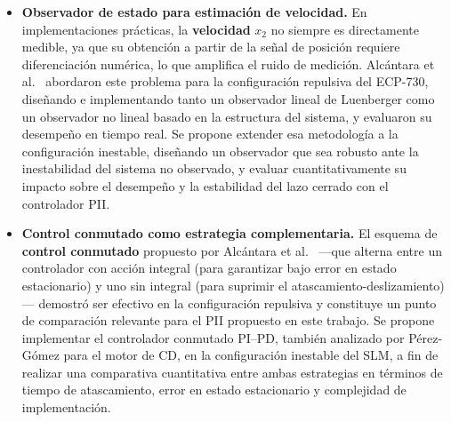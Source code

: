 \begin{itemize}
    \item \textbf{Observador de estado para estimación de velocidad.}
    En implementaciones prácticas, la \textbf{velocidad} $x_2$ no siempre es directamente
    medible, ya que su obtención a partir de la señal de posición requiere diferenciación
    numérica, lo que amplifica el ruido de medición. Alcántara et al.\ \cite{alcantara}
    abordaron este problema para la configuración repulsiva del ECP-730, diseñando e
    implementando tanto un observador lineal de Luenberger como un observador no lineal
    basado en la estructura del sistema, y evaluaron su desempeño en tiempo real.
    Se propone extender esa metodología a la configuración inestable, diseñando un observador
    que sea robusto ante la inestabilidad del sistema no observado, y evaluar cuantitativamente
    su impacto sobre el desempeño y la estabilidad del lazo cerrado con el controlador PII.

    \item \textbf{Control conmutado como estrategia complementaria.}
    El esquema de \textbf{control conmutado} propuesto por Alcántara et al.\ \cite{alcantara}
    ---que alterna entre un controlador con acción integral (para garantizar bajo error en estado
    estacionario) y uno sin integral (para suprimir el atascamiento-deslizamiento)--- demostró
    ser efectivo en la configuración repulsiva y constituye un punto de comparación relevante
    para el PII propuesto en este trabajo. Se propone implementar el controlador conmutado
    PI--PD, también analizado por Pérez-Gómez \cite{perez} para el motor de CD, en la
    configuración inestable del SLM, a fin de realizar una comparativa cuantitativa entre
    ambas estrategias en términos de tiempo de atascamiento, error en estado estacionario
    y complejidad de implementación.

\end{itemize}
